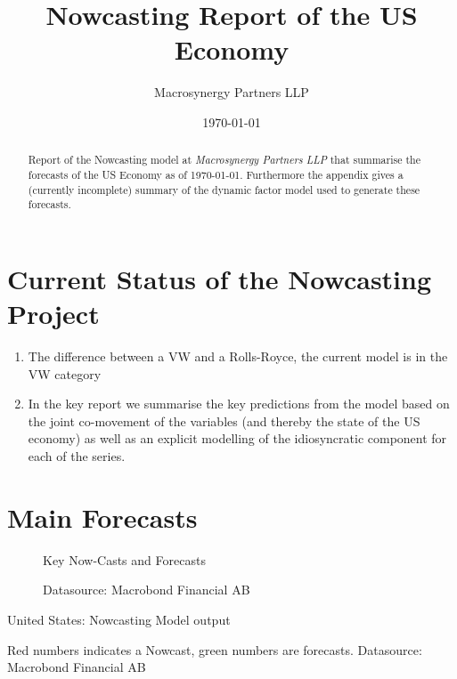 \documentclass[12pt]{article}
\title{Nowcasting Report of the US Economy}
\author{
	Macrosynergy Partners LLP
	}
\date{\today}
\begin{document}
\maketitle

\begin{abstract}
	Report of the Nowcasting model at \emph{Macrosynergy Partners LLP} that summarise the forecasts of the US Economy as of \today. Furthermore the appendix gives a (currently incomplete) summary of the dynamic factor model used to generate these forecasts.
\end{abstract}



\section{Current Status of the Nowcasting Project}
\begin{enumerate}
	\item	The difference between a VW and a Rolls-Royce, the current model is in the VW category
	\item 	In the key report we summarise the key predictions from the model based on the joint co-movement of the variables (and thereby the state of the US economy) as well as an explicit modelling of the idiosyncratic component for each of the series.
\end{enumerate}





\section{Main Forecasts}

\begin{figure}[ht]
	\centering
	\caption{Key Now-Casts and Forecasts}
	\caption*{\small{Datasource: Macrobond Financial AB}}
\end{figure}


\begin{landscape}
	\begin{table}[ht]
		\caption{United States: Nowcasting Model output}
		
		\label{tab:table4}
		\centering
		\caption*{\small{Red numbers indicates a Nowcast, green numbers are forecasts. Datasource: Macrobond Financial AB}}
	\end{table}
\end{landscape}
\end{document}
